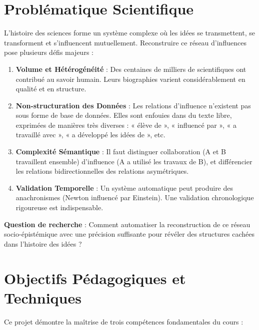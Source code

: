 \documentclass[12pt,a4paper]{report}
\begin{document}
\section{Problématique Scientifique}

L'histoire des sciences forme un système complexe où les idées se transmettent, se transforment et s'influencent mutuellement. Reconstruire ce réseau d'influences pose plusieurs défis majeurs :

\begin{enumerate}
    \item \textbf{Volume et Hétérogénéité} : Des centaines de milliers de scientifiques ont contribué au savoir humain. Leurs biographies varient considérablement en qualité et en structure.

    \item \textbf{Non-structuration des Données} : Les relations d'influence n'existent pas sous forme de base de données. Elles sont enfouies dans du texte libre, exprimées de manières très diverses : « élève de », « influencé par », « a travaillé avec », « a développé les idées de », etc.

    \item \textbf{Complexité Sémantique} : Il faut distinguer collaboration (A et B travaillent ensemble) d'influence (A a utilisé les travaux de B), et différencier les relations bidirectionnelles des relations asymétriques.

    \item \textbf{Validation Temporelle} : Un système automatique peut produire des anachronismes (Newton influencé par Einstein). Une validation chronologique rigoureuse est indispensable.
\end{enumerate}

\textbf{Question de recherche} : Comment automatiser la reconstruction de ce réseau socio-épistémique avec une précision suffisante pour révéler des structures cachées dans l'histoire des idées ?

\section{Objectifs Pédagogiques et Techniques}

Ce projet démontre la maîtrise de trois compétences fondamentales du cours :
\end{document}
